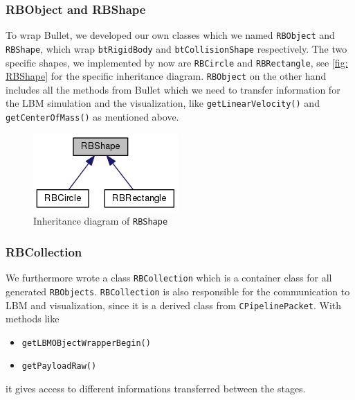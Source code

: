 \subsubsection*{RBObject and RBShape}
To wrap Bullet, we developed our own classes which we named \texttt{RBObject} and \texttt{RBShape}, which wrap \texttt{btRigidBody} and \texttt{btCollisionShape} respectively. The two specific shapes, we implemented by now are \texttt{RBCircle} and \texttt{RBRectangle}, see \autoref{fig: RBShape} for the specific inheritance diagram. \texttt{RBObject} on the other hand includes all the methods from Bullet which we need to transfer information for the LBM simulation and the visualization, like \texttt{getLinearVelocity()} and \texttt{getCenterOfMass()} as mentioned above. 
\begin{figure}[ht]
\centering
\includegraphics[scale=0.5]{img/RigidBodies/RBShapeGraph.png}
\caption{Inheritance diagram of \texttt{RBShape}}
\label{fig: RBShape}
\end{figure}

\subsubsection*{RBCollection}
We furthermore wrote a class \texttt{RBCollection} which is a container class for all generated \texttt{RBObjects}. \texttt{RBCollection} is also responsible for the communication to LBM and visualization, since it is a derived class from \texttt{CPipelinePacket}. With methods like 
\begin{itemize}
\item \texttt{getLBMOBjectWrapperBegin()}
\item \texttt{getPayloadRaw()}
\end{itemize} 
it gives access to different informations transferred between the stages. 

